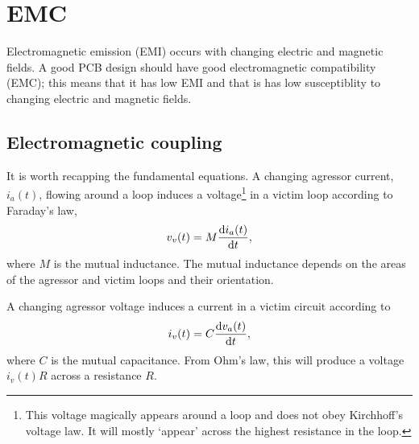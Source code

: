\chapter{EMC}


Electromagnetic emission (EMI) occurs with changing electric and
magnetic fields.  A good PCB design should have good electromagnetic
compatibility (EMC); this means that it has low EMI and that is has
low susceptiblity to changing electric and magnetic fields.


\section{Electromagnetic coupling}

It is worth recapping the fundamental equations.  A changing agressor
current, $i_a(t)$, flowing around a loop induces a
voltage\footnote{This voltage magically appears around a loop and does
  not obey Kirchhoff's voltage law.  It will mostly `appear' across
  the highest resistance in the loop.} in a victim loop according to
Faraday's law,
%
\begin{equation}
  v_v(t) = M \frac{\mathrm{d} i_a(t)}{\mathrm{d} t},
\end{equation}
%
where $M$ is the mutual inductance.  The mutual inductance depends on
the areas of the agressor and victim loops and their orientation.

A changing agressor voltage induces a current in a victim circuit
according to
%
\begin{equation}
  i_v(t) = C \frac{\mathrm{d} v_a(t)}{\mathrm{d} t},
\end{equation}
%
where $C$ is the mutual capacitance.  From Ohm's law, this will
produce a voltage $i_v(t) R$ across a resistance $R$.
